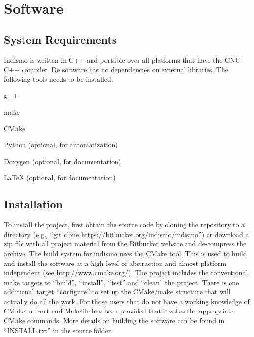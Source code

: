 \chapter{Software}
\label{chap:software}


\section{System Requirements}
\label{section:system}

Indismo is written in C++ and portable over all platforms that have the GNU C++ compiler. 
De software has no dependencies on external libraries. The following tools needs to be installed:
\begin{compactitem}
    \item g++
    \item make
    \item CMake
    \item Python (optional, for automatization)
    \item Doxygen (optional, for documentation)
    \item LaTeX (optional, for documentation)
\end{compactitem}


\section{Installation}
\label{section:Installation}

To install the project, first obtain the source code by cloning the repository to a directory (e.g., ``git clone
https://bitbucket.org/indismo/indismo'') or download a zip file with all project
material from the Bitbucket website and de-compress the archive. 
The build system for indismo uses the CMake tool. This is used to build and install the software at a high level of abstraction and almost platform independent (see \url{http://www.cmake.org/}). 
The project includes the conventional make targets to ``build'', ``install'', ``test'' and ``clean'' the project. There is one additional target ``configure'' to set up the CMake/make structure that will actually do all the work.
For those users that do not have a working knowledge of CMake, a front end Makefile has been provided that invokes the appropriate CMake commands.
More details on building the software can be found in ``INSTALL.txt'' in the source folder.


